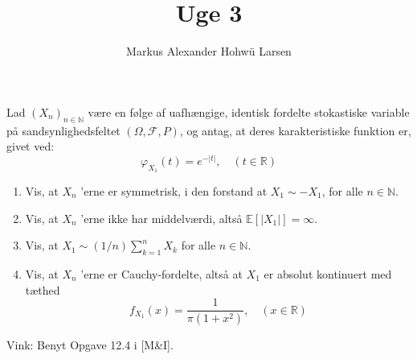 \documentclass{Class}
\title{Uge 3}
\author{Markus Alexander Hohwü Larsen}
\newcommand{\1}{\mathbbm{1}}
\theoremstyle{boxed}
\begin{document}
Lad $\left(X_n\right)_{n \in \mathbb{N}}$ være en følge af uafhængige, identisk fordelte stokastiske variable på sandsynlighedsfeltet $(\Omega, \mathcal{F}, P)$, og antag, at deres karakteristiske funktion er, givet ved:
$$
\varphi_{X_1}(t)=e^{-|t|}, \quad(t \in \mathbb{R})
$$
\begin{enumerate}
    \item Vis, at $X_n$ 'erne er symmetrisk, i den forstand at $X_1 \sim-X_1$, for alle $n \in \mathbb{N}$.
    \item Vis, at $X_n$ 'erne ikke har middelværdi, altså $\mathbb{E}\left[\left|X_1\right|\right]=\infty$.
    \item Vis, at $X_1 \sim(1 / n) \sum_{k=1}^n X_k$ for alle $n \in \mathbb{N}$.
    \item Vis, at $X_n$ 'erne er Cauchy-fordelte, altså at $X_1$ er absolut kontinuert med tæthed
    $$
f_{X_1}(x)=\frac{1}{\pi\left(1+x^2\right)}, \quad(x \in \mathbb{R})
$$
\end{enumerate}
Vink: Benyt Opgave 12.4 i [M\&I].
\solution
\end{document}
